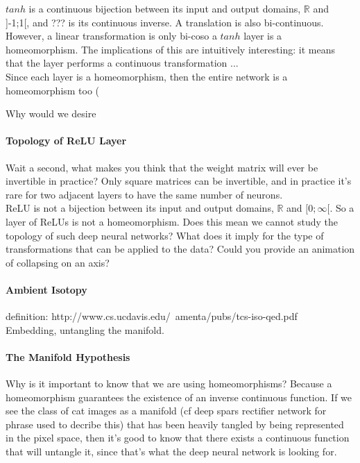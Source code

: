 \documentclass[a4paper,11pt]{article}
\begin{document}
$tanh$ is a continuous bijection between its input and output domains, $\mathbb{R}$ and ]-1;1[, and ??? is its continuous inverse.
 A translation is also bi-continuous. However, a linear transformation is only bi-coso a $tanh$ layer is a homeomorphism. The implications of this are intuitively interesting: it means that the layer performs a continuous transformation ... \\

Since each layer is a homeomorphism, then the entire network is a homeomorphism too (

Why would we desire 

\paragraph{Topology of ReLU Layer}

Wait a second, what makes you think that the weight matrix will ever be invertible in practice? Only square matrices can be invertible, and in practice it's rare for two adjacent layers to have the same number of neurons. \\

ReLU is not a bijection between its input and output domains, $\mathbb{R}$ and $[0;\infty[$. So a layer of ReLUs is not a homeomorphism. Does this mean we cannot study the topology of such deep neural networks? What does it imply for the type of transformations that can be applied to the data? Could you provide an animation of collapsing on an axis? \\

\paragraph{Ambient Isotopy}

definition:
http://www.cs.ucdavis.edu/~amenta/pubs/tcs-iso-qed.pdf \\

Embedding, untangling the manifold. \\

\paragraph{The Manifold Hypothesis}

Why is it important to know that we are using homeomorphisms? Because a homeomorphism guarantees the existence of an inverse continuous function. If we see the class of cat images as a manifold (cf deep spars rectifier network for phrase used to decribe this) that has been heavily tangled by being represented in the pixel space, then it's good to know that there exists a continuous function that will untangle it, since that's what the deep neural network is looking for.
\end{document}
